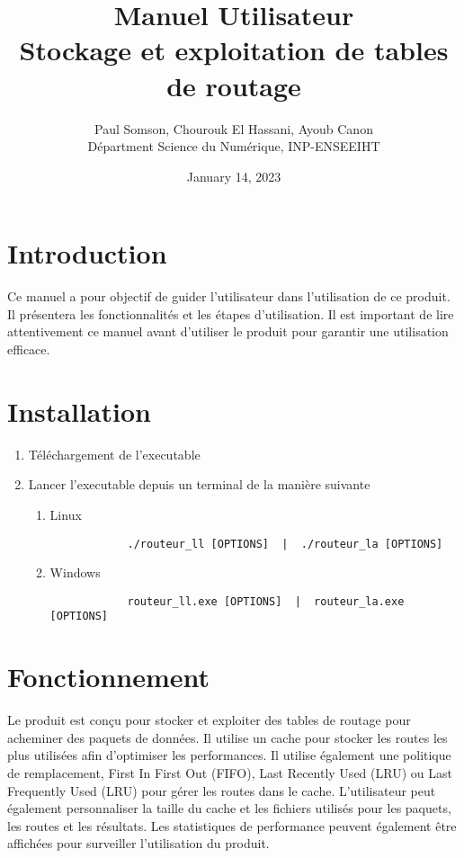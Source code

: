 \documentclass{article}
\title{%
  Manuel Utilisateur \\
  \large Stockage et exploitation de tables de routage}
\author{Paul Somson, Chourouk El Hassani, Ayoub Canon \\
    Départment Science du Numérique, INP-ENSEEIHT}
\date{January 14, 2023}
\begin{document}
\maketitle

\tableofcontents

\section{Introduction}
Ce manuel a pour objectif de guider l'utilisateur dans l'utilisation de ce produit. Il présentera les fonctionnalités et les étapes d'utilisation. Il est important de lire attentivement ce manuel avant d'utiliser le produit pour garantir une utilisation efficace.

\section{Installation}
\begin{enumerate}
    \item Téléchargement de l'executable
    \item Lancer l'executable depuis un terminal de la manière suivante
    \begin{enumerate}
        \item Linux
        \begin{verbatim}
            ./routeur_ll [OPTIONS]  |  ./routeur_la [OPTIONS]
        \end{verbatim}
        \item Windows
        \begin{verbatim}
            routeur_ll.exe [OPTIONS]  |  routeur_la.exe [OPTIONS]
        \end{verbatim}
    \end{enumerate}
\end{enumerate}

\section{Fonctionnement}
Le produit est conçu pour stocker et exploiter des tables de routage pour acheminer des paquets de données. Il utilise un cache pour stocker les routes les plus utilisées afin d'optimiser les performances. Il utilise également une politique de remplacement, First In First Out (FIFO), Last Recently Used (LRU) ou Last Frequently Used (LRU) pour gérer les routes dans le cache. L'utilisateur peut également personnaliser la taille du cache et les fichiers utilisés pour les paquets, les routes et les résultats. Les statistiques de performance peuvent également être affichées pour surveiller l'utilisation du produit.
\end{document}
